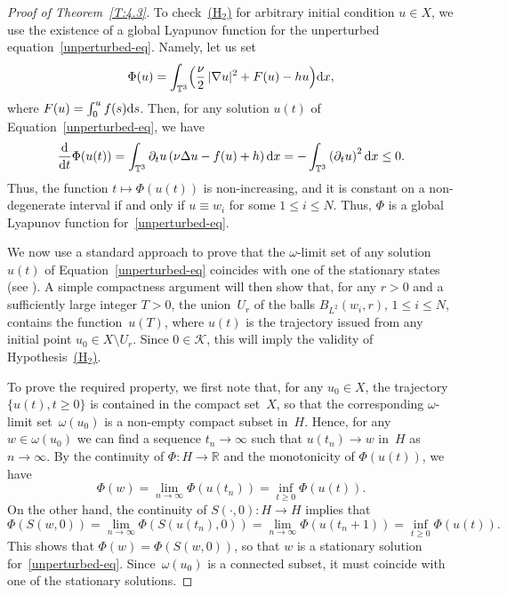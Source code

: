 \documentclass[JEP,XML,SOM,Unicode,ThmDefs]{cedram}
\let\mathcal\mathscr
\theoremstyle{plain}
\numberwithin{equation}{section}
\let\p\partial
\let\ty\infty
\newcommand{\dd}{{\textup d}}
\newcommand{\R}{{\mathbb R}}
\newcommand{\T}{{\mathbb T}}
\newcommand{\KK}{{\mathcal K}}
\begin{document}
\begin{proof}[Proof of Theorem~\ref{T:4.3}]
To check~\hyperlink{H2}{(H$_2$)} for arbitrary initial condition $u\in X$, we use the existence of a global Lyapunov function for the unperturbed equation~\eqref{unperturbed-eq}. Namely, let us set
\begin{equation}\label{E:4.5}
\Phi(u)=\int_{\T^3} \Bigl(\frac\nu2\,|\nabla u|^2+F(u)-hu\Bigr)\dd x,
\end{equation}
where $F(u)=\int_0^uf(s)\dd s$. Then, for any solution $u(t)$ of Equation~\eqref{unperturbed-eq}, we have
\[
\frac{\dd}{\dd t} \Phi(u(t))=\int_{\T^3} \p_tu\left(\nu \Delta u- f(u)+h \right)\dd x=-\int_{\T^3} \left(\p_tu\right)^2\dd x\le 0.
\]
Thus, the function $t\mapsto \Phi(u(t))$ is non-increasing, and it is constant on a non-degenerate interval if and only if $u\equiv w_i$ for some $1\le i\le N$. Thus, $\varPhi$ is a global Lyapunov function for~\eqref{unperturbed-eq}.

We now use a standard approach to prove that the $\omega$-limit set of any solution~$u(t)$ of Equation~\eqref{unperturbed-eq} coincides with one of the stationary states (\eg see \cite[Chap.\,3,\,\S2]{BV1992}). A simple compactness argument will then show that, for any $r>0$ and a sufficiently large integer $T>0$, the union~$U_r$ of the balls $B_{L^2}(w_i,r)$, $1\le i\le N$, contains the function~$u(T)$, where $u(t)$ is the trajectory issued from any initial point $u_0\in X\setminus U_r$. Since $0\in \KK$, this will imply the validity of Hypothesis~\hyperlink{H2}{(H$_2$)}.

To prove the required property, we first note that, for any $u_0\in X$, the trajectory $\{u(t), t\ge0\}$ is contained in the compact set~$X$, so that the corresponding $\omega$-limit set~$\omega(u_0)$ is a non-empty compact subset in~$H$. Hence, for any $w\in \omega(u_0)$ we can find a sequence $t_n\to \ty$ such that $u(t_n)\to w$ in~$H$ as $n\to\ty$. By the continuity of $\Phi: H\to \R$ and the monotonicity of $\Phi(u(t))$, we have
\[
\Phi(w)=\lim_{n\to \ty}\Phi(u(t_n))= \inf_{t\ge0} \Phi(u(t)).
\]
On the other hand, the continuity of $S(\cdot,0):H\to H$ implies that
\[
\Phi(S(w,0))=\lim_{n\to \ty}\Phi(S(u(t_n),0))=\lim_{n\to \ty}\Phi(u(t_n+1))=\inf_{t\ge0} \Phi(u(t)).
\]
This shows that $\Phi(w)=\Phi(S(w,0))$, so that $w$ is a stationary solution for~\eqref{unperturbed-eq}. Since~$\omega(u_0)$ is a connected subset, it must coincide with one of the stationary solutions.


\end{proof}
\end{document}
